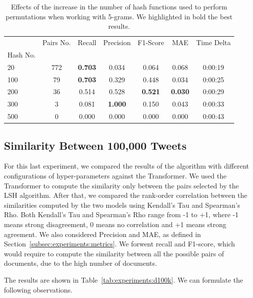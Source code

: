 \documentclass[runningheads]{llncs}
\begin{document}
\begin{table}
  \caption{Effects of the increase in the number of hash functions used to perform permutations when working with 5-grams. We highlighted in bold the best results.}
  \label{tab:experiments:hashes_k5}
  \centering
  \begin{tabular}{lcccccc}
    \toprule
    {} &  Pairs No. &  Recall &  Precision &  F1-Score &    MAE & Time Delta \\
    Hash No. &            &         &            &           &        &            \\
    \midrule
    20       &        772 &   \textbf{0.703} &      0.034 &     0.064 &  0.068 &    0:00:19 \\
    100      &         79 &   \textbf{0.703} &      0.329 &     0.448 &  0.034 &    0:00:25 \\
    200      &         36 &   0.514 &      0.528 &     \textbf{0.521} &  \textbf{0.030} &    0:00:29 \\
    300      &          3 &   0.081 &      \textbf{1.000} &     0.150 &  0.043 &    0:00:33 \\
    500      &          0 &   0.000 &      0.000 &     0.000 &  0.000 &    0:00:43 \\
    \bottomrule
    \end{tabular}
\end{table}

\subsection{Similarity Between 100,000 Tweets}
\label{subsec:experiments:100k}

For this last experiment, we compared the results of the algorithm with different configurations of hyper-parameters against the Transformer. We used the Transformer to compute the similarity only between the pairs selected by the LSH algorithm. After that, we compared the rank-order correlation between the similarities computed by the two models using Kendall's Tau and Spearman's Rho. Both Kendall's Tau and Spearman's Rho range from -1 to +1, where -1 means strong disagreement, 0 means no correlation and +1 means strong agreement. We also considered Precision and MAE, as defined in Section~\ref{subsec:experiments:metrics}. We forwent recall and F1-score, which would require to compute the similarity between all the possible pairs of documents, due to the high number of documents.

The results are shown in Table~\ref{tab:experiments:d100k}. We can formulate the following observations.
\end{document}

